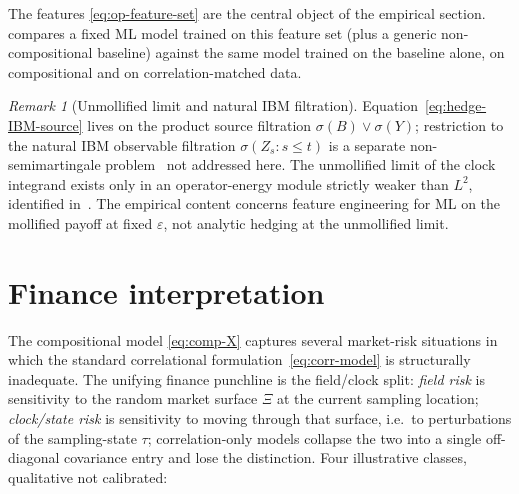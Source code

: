 \documentclass[11pt,reqno]{amsart}
\theoremstyle{plain}
\theoremstyle{definition}
\theoremstyle{remark}
\newtheorem{remark}[theorem]{Remark}
\newcommand{\IBM}{Z}
\newcommand{\Bvar}{B}
\newcommand{\Yclock}{Y}
\begin{document}
The features \eqref{eq:op-feature-set} are the central object
of the empirical section.  compares a
fixed ML model trained on this feature set (plus a generic
non-compositional baseline) against the same model trained on
the baseline alone, on compositional and on correlation-matched
data.

\begin{remark}[Unmollified limit and natural IBM filtration]\label{rem:hedge-not-the-point}
Equation~\eqref{eq:hedge-IBM-source} lives on the product
source filtration $\sigma(\Bvar)\vee\sigma(\Yclock)$;
restriction to the natural IBM observable filtration
$\sigma(\IBM_{s}:s\le t)$ is a separate non-semimartingale
problem~\cite{EnergyFirst} not addressed here. The unmollified
limit of the clock integrand exists only in an operator-energy
module strictly weaker than $L^{2}$, identified
in~\cite{EnergyFirst,FCDC,BidegreeAtlas}. The empirical content
concerns feature engineering for ML on the mollified payoff at
fixed $\varepsilon$, not analytic hedging at the unmollified
limit.
\end{remark}

\section{Finance interpretation}\label{sec:finance}

The compositional model \eqref{eq:comp-X} captures several
market-risk situations in which the standard correlational
formulation~\eqref{eq:corr-model} is structurally inadequate.
The unifying finance punchline is the field/clock split:
\emph{field risk} is sensitivity to the random market surface
$\Xi$ at the current sampling location; \emph{clock/state risk}
is sensitivity to moving through that surface, i.e.\ to
perturbations of the sampling-state $\tau$; correlation-only
models collapse the two into a single off-diagonal covariance
entry and lose the distinction. Four illustrative classes,
qualitative not calibrated:
\end{document}
